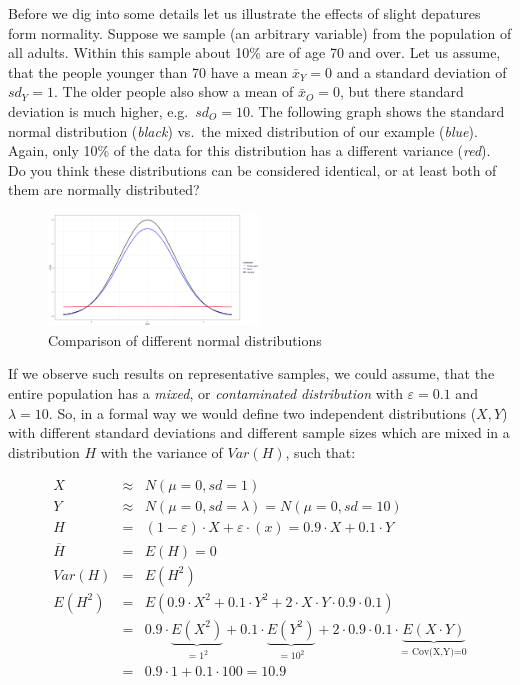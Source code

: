 \documentclass[
]{article}
\begin{document}
Before we dig into some details let us illustrate the effects of slight depatures form normality. Suppose we sample (an arbitrary variable) from the population of all adults. Within this sample about 10\% are of age 70 and over. Let us assume, that the people younger than 70 have a mean \(\bar{x}_Y = 0\) and a standard deviation of \(sd_Y = 1\). The older people also show a mean of \(\bar{x}_O = 0\), but there standard deviation is much higher, e.g.~\(sd_O = 10\). The following graph shows the standard normal distribution (\emph{black}) vs.~the mixed distribution of our example ({\emph{blue}}). Again, only 10\% of the data for this distribution has a different variance ({\emph{red}}). Do you think these distributions can be considered identical, or at least both of them are normally distributed?

\begin{figure}
\centering
\includegraphics[width=0.5\textwidth,height=\textheight]{Images/Wilcox-2-Contaminated-Full-Plot.jpg}
\caption{Comparison of different normal distributions}
\end{figure}

If we observe such results on representative samples, we could assume, that the entire population has a \emph{mixed}, or \emph{contaminated distribution} with \(\varepsilon = 0.1\) and \(\lambda = 10\). So, in a formal way we would define two independent distributions (\(X, Y\)) with different standard deviations and different sample sizes which are mixed in a distribution \(H\) with the variance of \(Var(H)\), such that:

\[\begin{array}{ccc}
  X            & \approx & N(\mu = 0, sd = 1) \\
  Y            & \approx & N(\mu = 0, sd = \lambda) = N(\mu = 0, sd = 10) \\
  H            & = & (1-\varepsilon) \cdot X + \varepsilon \cdot (x)  = 0.9 \cdot X + 0.1 \cdot Y\\
  \overline{H} & = & E(H) = 0 \\
  Var(H)       & = & E(H^2) \\
  E(H^2)       & = & E(0.9 \cdot X^2 + 0.1 \cdot Y^2 + 2 \cdot X \cdot Y \cdot 0.9 \cdot 0.1) \\
               & = &  0.9 \cdot \underbrace{E(X^2)}_{=1^2} + 0.1 \cdot \underbrace{E(Y^2)}_{=10^2} + 2 \cdot 0.9 \cdot 0.1 \cdot \underbrace{E(X \cdot Y)}_{\text{= Cov(X,Y)=0}} \\
               & = &  0.9 \cdot 1 + 0.1 \cdot 100 = 10.9
\end{array}\]
\end{document}
